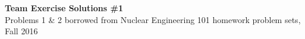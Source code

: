 \documentclass{report}
\begin{document}
\thispagestyle{FirstPage}
\begin{center}
\textbf{\large Team Exercise Solutions \#1}
\-\\
{\small *Problems 1 \& 2 borrowed from Nuclear Engineering 101 homework problem sets, Fall 2016}
\end{center}




\newpage



\newpage



\newpage



\end{document}
